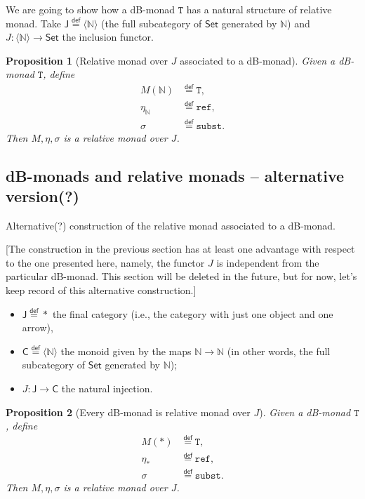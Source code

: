 \documentclass[a4paper,twoside,12pt]{article}
\newtheorem{proposition}{Proposition}
\theoremstyle{definition}
\theoremstyle{remark}
\newcommand{\NN}{\mathbb{N}}
\newcommand{\subst}{\mathtt{subst}}
\newcommand{\refe}{\mathtt{ref}}
\newcommand{\TT}{\mathtt{T}}
\begin{document}
We are going to show how a dB-monad $\TT$ has a natural structure of
relative monad.  Take
$\mathsf{J} \stackrel{\mathsf{def}}{=}\langle \NN \rangle$ (the full
subcategory of $\mathsf{Set}$ generated by $\NN$) and
$J\colon \langle \NN \rangle \to \mathsf{Set}$ the inclusion functor.

\begin{proposition}[Relative monad over $J$ associated to a dB-monad]
  Given a dB-monad $\TT$, define
  \begin{align*}
    M(\NN) &\stackrel{\mathsf{def}}{=} \TT, \\
    \eta_\NN &\stackrel{\mathsf{def}}{=} \refe, \\
    \sigma &\stackrel{\mathsf{def}}{=} \subst.
  \end{align*}
  Then $M,\eta,\sigma$ is a relative monad over $J$.
\end{proposition}

\subsection{dB-monads and relative monads -- alternative version(?)}
\label{sec:subst-rel-monads-alt}

Alternative(?) construction of the relative monad associated to a
dB-monad.

[The construction in the previous section has at least one advantage
with respect to the one presented here, namely, the functor $J$ is
independent from the particular dB-monad.  This section will be
deleted in the future, but for now, let's keep record of this
alternative construction.]

\begin{itemize}
\item $\mathsf{J}\stackrel{\mathsf{def}}{=}*$ the final category
  (i.e., the category with just one object and one arrow),
\item $\mathsf{C}\stackrel{\mathsf{def}}{=}\langle\NN\rangle$ the
  monoid given by the maps $\NN\to\NN$ (in other words, the full
  subcategory of $\mathsf{Set}$ generated by $\NN$);
\item $J\colon \mathsf{J} \to \mathsf{C}$ the natural injection.
\end{itemize}

\begin{proposition}[Every dB-monad is relative monad over $J$]
  Given a dB-monad $\TT$, define
  \begin{align*}
    M(*) &\stackrel{\mathsf{def}}{=} \TT, \\
    \eta_* &\stackrel{\mathsf{def}}{=} \refe, \\
    \sigma &\stackrel{\mathsf{def}}{=} \subst.
  \end{align*}
  Then $M,\eta,\sigma$ is a relative monad over $J$.
\end{proposition}
\end{document}
